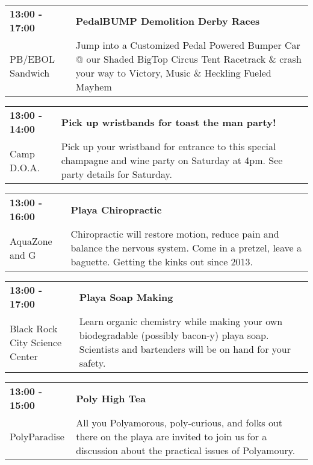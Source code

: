\begin{tabular}{ p{1in} p{2.2in} }
    \textbf{13:00 - 17:00} & \textbf{PedalBUMP Demolition Derby Races} \\
    PB/EBOL Sandwich \newline  & Jump into a Customized Pedal Powered Bumper Car @ our Shaded BigTop Circus Tent Racetrack \& crash your way to Victory, Music \& Heckling Fueled Mayhem \\
    \hline 
\end{tabular}
    
\begin{tabular}{ p{1in} p{2.2in} }
    \textbf{13:00 - 14:00} & \textbf{Pick up wristbands for toast the man party!} \\
    Camp D.O.A. \newline  & Pick up your wristband for entrance to this special champagne and wine party on Saturday at 4pm. See party details for Saturday. \\
    \hline 
\end{tabular}
    
\begin{tabular}{ p{1in} p{2.2in} }
    \textbf{13:00 - 16:00} & \textbf{Playa Chiropractic} \\
    AquaZone \newline 3 and G & Chiropractic will restore motion, reduce pain and balance the nervous system.  Come in a pretzel, leave a baguette. Getting the kinks out since 2013. \\
    \hline 
\end{tabular}
    
\begin{tabular}{ p{1in} p{2.2in} }
    \textbf{13:00 - 17:00} & \textbf{Playa Soap Making} \\
    Black Rock City Science Center \newline  & Learn organic chemistry while making your own biodegradable (possibly bacon-y) playa soap. Scientists and bartenders will be on hand for your safety. \\
    \hline 
\end{tabular}
    
\begin{tabular}{ p{1in} p{2.2in} }
    \textbf{13:00 - 15:00} & \textbf{Poly High Tea} \\
    PolyParadise \newline  & All you Polyamorous, poly-curious, and folks out there on the playa are invited to join us for a discussion about the practical issues of Polyamoury. \\
    \hline 
\end{tabular}
    
